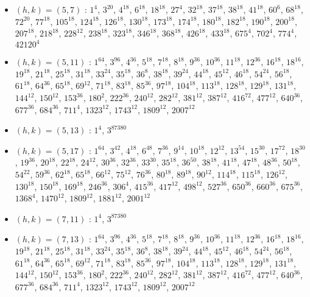 \begin{itemize}
\item $(h,k)=(5,7)$ : $1^{4}$, $3^{20}$, $4^{18}$, $6^{18}$, $18^{18}$, $27^{4}$, $32^{18}$, $37^{18}$, $38^{18}$, $41^{18}$, $60^{6}$, $68^{18}$, $72^{20}$, $77^{18}$, $105^{18}$, $124^{18}$, $126^{18}$, $130^{18}$, $173^{18}$, $174^{18}$, $180^{18}$, $182^{18}$, $190^{18}$, $200^{18}$, $207^{18}$, $218^{18}$, $228^{12}$, $238^{18}$, $323^{18}$, $346^{18}$, $368^{18}$, $426^{18}$, $433^{18}$, $675^{4}$, $702^{4}$, $774^{4}$, $42120^{4}$
\item $(h,k)=(5,11)$ : $1^{64}$, $3^{96}$, $4^{36}$, $5^{18}$, $7^{18}$, $8^{18}$, $9^{36}$, $10^{36}$, $11^{18}$, $12^{36}$, $16^{18}$, $18^{16}$, $19^{18}$, $21^{18}$, $25^{18}$, $31^{18}$, $33^{24}$, $35^{18}$, $36^{8}$, $38^{18}$, $39^{24}$, $44^{18}$, $45^{12}$, $46^{18}$, $54^{24}$, $56^{18}$, $61^{18}$, $64^{36}$, $65^{18}$, $69^{12}$, $71^{18}$, $83^{18}$, $85^{36}$, $97^{18}$, $104^{18}$, $113^{18}$, $128^{18}$, $129^{18}$, $131^{18}$, $144^{12}$, $150^{12}$, $153^{36}$, $180^{2}$, $222^{36}$, $240^{12}$, $282^{12}$, $381^{12}$, $387^{12}$, $416^{72}$, $477^{12}$, $640^{36}$, $677^{36}$, $684^{36}$, $711^{4}$, $1323^{12}$, $1743^{12}$, $1809^{12}$, $2007^{12}$
\item $(h,k)=(5,13)$ : $1^{4}$, $3^{87380}$
\item $(h,k)=(5,17)$ : $1^{64}$, $3^{42}$, $4^{18}$, $6^{48}$, $7^{36}$, $9^{14}$, $10^{18}$, $12^{12}$, $13^{54}$, $15^{30}$, $17^{72}$, $18^{30}$, $19^{36}$, $20^{18}$, $22^{18}$, $24^{12}$, $30^{36}$, $32^{36}$, $33^{30}$, $35^{18}$, $36^{50}$, $38^{18}$, $41^{18}$, $47^{18}$, $48^{36}$, $50^{18}$, $54^{22}$, $59^{36}$, $62^{18}$, $65^{18}$, $66^{12}$, $75^{12}$, $76^{36}$, $80^{18}$, $89^{18}$, $90^{12}$, $114^{18}$, $115^{18}$, $126^{12}$, $130^{18}$, $150^{18}$, $169^{18}$, $246^{36}$, $306^{4}$, $415^{36}$, $417^{12}$, $498^{12}$, $527^{36}$, $650^{36}$, $660^{36}$, $675^{36}$, $1368^{4}$, $1470^{12}$, $1809^{12}$, $1881^{12}$, $2001^{12}$
\item $(h,k)=(7,11)$ : $1^{4}$, $3^{87380}$
\item $(h,k)=(7,13)$ : $1^{64}$, $3^{96}$, $4^{36}$, $5^{18}$, $7^{18}$, $8^{18}$, $9^{36}$, $10^{36}$, $11^{18}$, $12^{36}$, $16^{18}$, $18^{16}$, $19^{18}$, $21^{18}$, $25^{18}$, $31^{18}$, $33^{24}$, $35^{18}$, $36^{8}$, $38^{18}$, $39^{24}$, $44^{18}$, $45^{12}$, $46^{18}$, $54^{24}$, $56^{18}$, $61^{18}$, $64^{36}$, $65^{18}$, $69^{12}$, $71^{18}$, $83^{18}$, $85^{36}$, $97^{18}$, $104^{18}$, $113^{18}$, $128^{18}$, $129^{18}$, $131^{18}$, $144^{12}$, $150^{12}$, $153^{36}$, $180^{2}$, $222^{36}$, $240^{12}$, $282^{12}$, $381^{12}$, $387^{12}$, $416^{72}$, $477^{12}$, $640^{36}$, $677^{36}$, $684^{36}$, $711^{4}$, $1323^{12}$, $1743^{12}$, $1809^{12}$, $2007^{12}$

\end{itemize}

